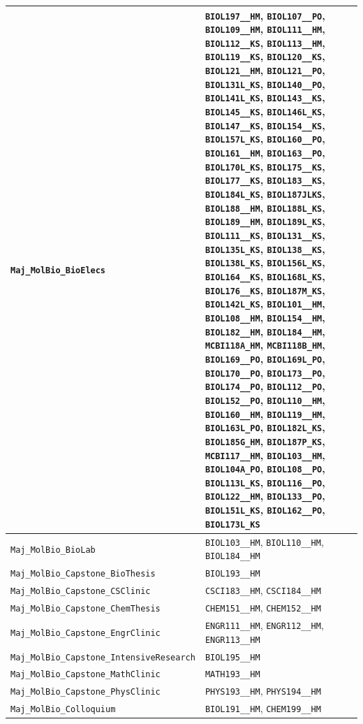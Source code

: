 \begin{longtable}{|p{4.4in}|p{4.4in}|}
    \verb|Maj_MolBio_BioElecs| & \verb|BIOL197__HM|, \verb|BIOL107__PO|, \verb|BIOL109__HM|, \verb|BIOL111__HM|, \verb|BIOL112__KS|, \verb|BIOL113__HM|, \verb|BIOL119__KS|, \verb|BIOL120__KS|, \verb|BIOL121__HM|, \verb|BIOL121__PO|, \verb|BIOL131L_KS|, \verb|BIOL140__PO|, \verb|BIOL141L_KS|, \verb|BIOL143__KS|, \verb|BIOL145__KS|, \verb|BIOL146L_KS|, \verb|BIOL147__KS|, \verb|BIOL154__KS|, \verb|BIOL157L_KS|, \verb|BIOL160__PO|, \verb|BIOL161__HM|, \verb|BIOL163__PO|, \verb|BIOL170L_KS|, \verb|BIOL175__KS|, \verb|BIOL177__KS|, \verb|BIOL183__KS|, \verb|BIOL184L_KS|, \verb|BIOL187JLKS|, \verb|BIOL188__HM|, \verb|BIOL188L_KS|, \verb|BIOL189__HM|, \verb|BIOL189L_KS|, \verb|BIOL111__KS|, \verb|BIOL131__KS|, \verb|BIOL135L_KS|, \verb|BIOL138__KS|, \verb|BIOL138L_KS|, \verb|BIOL156L_KS|, \verb|BIOL164__KS|, \verb|BIOL168L_KS|, \verb|BIOL176__KS|, \verb|BIOL187M_KS|, \verb|BIOL142L_KS|, \verb|BIOL101__HM|, \verb|BIOL108__HM|, \verb|BIOL154__HM|, \verb|BIOL182__HM|, \verb|BIOL184__HM|, \verb|MCBI118A_HM|, \verb|MCBI118B_HM|, \verb|BIOL169__PO|, \verb|BIOL169L_PO|, \verb|BIOL170__PO|, \verb|BIOL173__PO|, \verb|BIOL174__PO|, \verb|BIOL112__PO|, \verb|BIOL152__PO|, \verb|BIOL110__HM|, \verb|BIOL160__HM|, \verb|BIOL119__HM|, \verb|BIOL163L_PO|, \verb|BIOL182L_KS|, \verb|BIOL185G_HM|, \verb|BIOL187P_KS|, \verb|MCBI117__HM|, \verb|BIOL103__HM|, \verb|BIOL104A_PO|, \verb|BIOL108__PO|, \verb|BIOL113L_KS|, \verb|BIOL116__PO|, \verb|BIOL122__HM|, \verb|BIOL133__PO|, \verb|BIOL151L_KS|, \verb|BIOL162__PO|, \verb|BIOL173L_KS|\\\hline
    \verb|Maj_MolBio_BioLab| & \verb|BIOL103__HM|, \verb|BIOL110__HM|, \verb|BIOL184__HM|\\\hline
    \verb|Maj_MolBio_Capstone_BioThesis| & \verb|BIOL193__HM|\\\hline
    \verb|Maj_MolBio_Capstone_CSClinic| & \verb|CSCI183__HM|, \verb|CSCI184__HM|\\\hline
    \verb|Maj_MolBio_Capstone_ChemThesis| & \verb|CHEM151__HM|, \verb|CHEM152__HM|\\\hline
    \verb|Maj_MolBio_Capstone_EngrClinic| & \verb|ENGR111__HM|, \verb|ENGR112__HM|, \verb|ENGR113__HM|\\\hline
    \verb|Maj_MolBio_Capstone_IntensiveResearch| & \verb|BIOL195__HM|\\\hline
    \verb|Maj_MolBio_Capstone_MathClinic| & \verb|MATH193__HM|\\\hline
    \verb|Maj_MolBio_Capstone_PhysClinic| & \verb|PHYS193__HM|, \verb|PHYS194__HM|\\\hline
    \verb|Maj_MolBio_Colloquium| & \verb|BIOL191__HM|, \verb|CHEM199__HM|\\\hline

\end{longtable}
